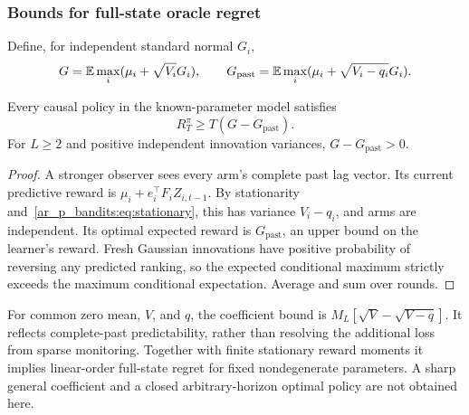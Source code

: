 \subsubsection{Bounds for full-state oracle regret}
Define, for independent standard normal $G_i$,
\begin{equation}
G=\mathbb E\max_i(\mu_i+\sqrt{V_i}G_i),\qquad
G_{\mathrm{past}}=\mathbb E\max_i(\mu_i+\sqrt{V_i-q_i}G_i).
\end{equation}

\begin{proposition}
Every causal policy in the known-parameter model satisfies
\begin{equation}
\boxed{R_T^\pi\geq T(G-G_{\mathrm{past}}).}
\end{equation}
For $L\geq2$ and positive independent innovation variances, $G-G_{\mathrm{past}}>0$.
\end{proposition}
\begin{proof}
A stronger observer sees every arm's complete past lag vector. Its current predictive reward is $\mu_i+e_i^\top F_iZ_{i,t-1}$. By stationarity and~\eqref{ar_p_bandits:eq:stationary}, this has variance $V_i-q_i$, and arms are independent. Its optimal expected reward is $G_{\mathrm{past}}$, an upper bound on the learner's reward. Fresh Gaussian innovations have positive probability of reversing any predicted ranking, so the expected conditional maximum strictly exceeds the maximum conditional expectation. Average and sum over rounds.
\end{proof}
For common zero mean, $V$, and $q$, the coefficient bound is
$M_L[\sqrt V-\sqrt{V-q}]$. It reflects complete-past predictability, rather than resolving the additional loss from sparse monitoring. Together with finite stationary reward moments it implies linear-order full-state regret for fixed nondegenerate parameters. A sharp general coefficient and a closed arbitrary-horizon optimal policy are not obtained here.

